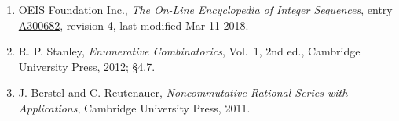 \documentclass[11pt]{article}
\theoremstyle{definition}
\begin{document}
\begin{enumerate}

\item OEIS Foundation Inc., \emph{The On-Line Encyclopedia of Integer Sequences}, entry \href{https://oeis.org/A300682}{A300682}, revision 4, last modified Mar 11 2018.

\item R. P. Stanley, \emph{Enumerative Combinatorics}, Vol.~1, 2nd ed., Cambridge University Press, 2012; \S4.7.

\item J. Berstel and C. Reutenauer, \emph{Noncommutative Rational Series with Applications}, Cambridge University Press, 2011.

\end{enumerate}
\end{document}
